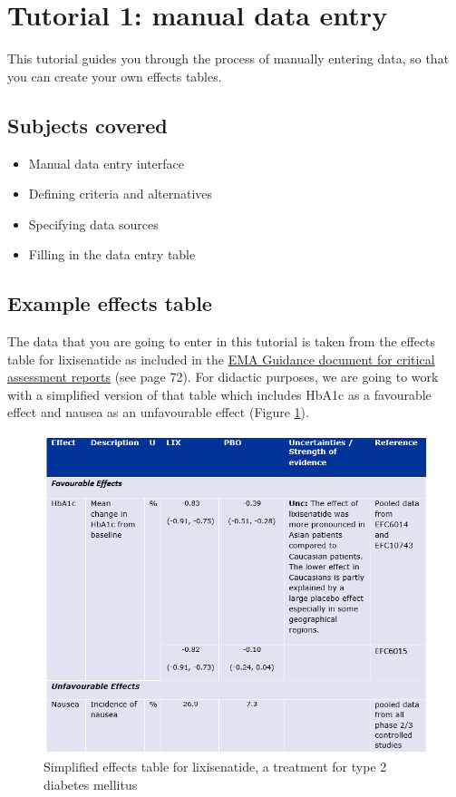 \documentclass[00_mcda_tutorial.tex]{subfiles}
\begin{document}
\section*{Tutorial 1: manual data entry}
\addtocounter{section}{1}

This tutorial guides you through the process of manually entering data, so that you can create your own effects tables.

\subsection{Subjects covered}
\begin{itemize}
\item Manual data entry interface
\item Defining criteria and alternatives
\item Specifying data sources
\item Filling in the data entry table
\end{itemize}

\subsection{Example effects table}
The data that you are going to enter in this tutorial is taken from the effects table for lixisenatide as included in the \href{https://www.ema.europa.eu/documents/template-form/day-80-assessment-report-overview-d120-loq-template-guidance-rev-0718_en.doc}{EMA Guidance document for critical assessment reports} (see page 72).  For didactic purposes, we are going to work with a simplified version of that table which includes HbA1c as a favourable effect and nausea as an unfavourable effect (Figure \ref{fig:lixisenatide_effect_table}).

\begin{figure}[!h]
    \centering
	\includegraphics[width=\textwidth]{fig/lixiEffectTable.png}
    \caption{Simplified effects table for lixisenatide, a treatment for type 2 diabetes mellitus}
	\label{fig:lixisenatide_effect_table}
\end{figure}
\end{document}
